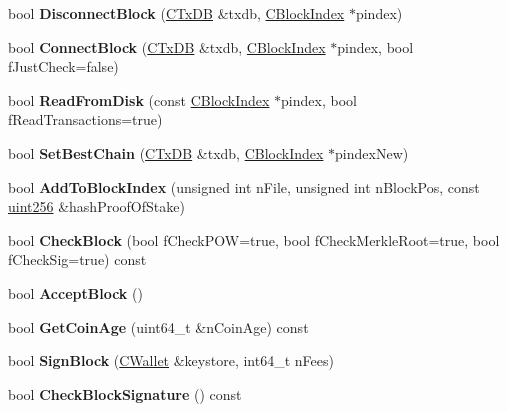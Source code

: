 \begin{DoxyCompactItemize}
\item 
\mbox{\label{class_c_block_a9532c041d24701a338ea5c91008b72aa}} 
bool {\bfseries Disconnect\+Block} (\mbox{\hyperlink{class_c_tx_d_b}{C\+Tx\+DB}} \&txdb, \mbox{\hyperlink{class_c_block_index}{C\+Block\+Index}} $\ast$pindex)
\item 
\mbox{\label{class_c_block_a1ae149d97c7b7eadf48f5cea934b6217}} 
bool {\bfseries Connect\+Block} (\mbox{\hyperlink{class_c_tx_d_b}{C\+Tx\+DB}} \&txdb, \mbox{\hyperlink{class_c_block_index}{C\+Block\+Index}} $\ast$pindex, bool f\+Just\+Check=false)
\item 
\mbox{\label{class_c_block_ad31bb55c819816d722ebc0980d85cfc7}} 
bool {\bfseries Read\+From\+Disk} (const \mbox{\hyperlink{class_c_block_index}{C\+Block\+Index}} $\ast$pindex, bool f\+Read\+Transactions=true)
\item 
\mbox{\label{class_c_block_a6e308b2d75d1cfc4a75eda36feb60ca1}} 
bool {\bfseries Set\+Best\+Chain} (\mbox{\hyperlink{class_c_tx_d_b}{C\+Tx\+DB}} \&txdb, \mbox{\hyperlink{class_c_block_index}{C\+Block\+Index}} $\ast$pindex\+New)
\item 
\mbox{\label{class_c_block_a52cbb86570e849a9dee6447e88b35875}} 
bool {\bfseries Add\+To\+Block\+Index} (unsigned int n\+File, unsigned int n\+Block\+Pos, const \mbox{\hyperlink{classuint256}{uint256}} \&hash\+Proof\+Of\+Stake)
\item 
\mbox{\label{class_c_block_a423d19b5a2bf03e26cd412976df3ab20}} 
bool {\bfseries Check\+Block} (bool f\+Check\+P\+OW=true, bool f\+Check\+Merkle\+Root=true, bool f\+Check\+Sig=true) const
\item 
\mbox{\label{class_c_block_a3f990a713116bd15c1f221c88b012ccf}} 
bool {\bfseries Accept\+Block} ()
\item 
\mbox{\label{class_c_block_a3a266ee274b641c5f48e2fa7aeec8d1d}} 
bool {\bfseries Get\+Coin\+Age} (uint64\+\_\+t \&n\+Coin\+Age) const
\item 
\mbox{\label{class_c_block_a12f11b1abfd360100eb619c3880ff752}} 
bool {\bfseries Sign\+Block} (\mbox{\hyperlink{class_c_wallet}{C\+Wallet}} \&keystore, int64\+\_\+t n\+Fees)
\item 
\mbox{\label{class_c_block_a2ff0deeda85c23cde1a78365d6fc6c2c}} 
bool {\bfseries Check\+Block\+Signature} () const
\end{DoxyCompactItemize}
